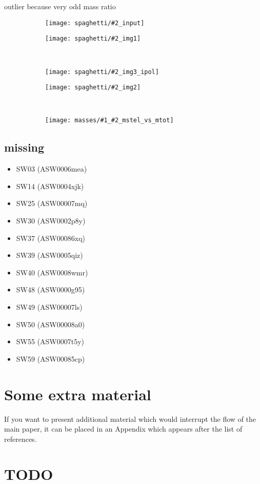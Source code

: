 \documentclass[fleqn,usenatbib]{mnras}
\newcommand{\inclfig}[2]{
  \centering
  \begin{subfigure}{0.5\linewidth}
    \texttt{[image: spaghetti/\#2\_input]}
  \end{subfigure}%
  \begin{subfigure}{0.5\linewidth}
    \texttt{[image: spaghetti/\#2\_img1]}
  \end{subfigure}%
  \\[-1px]%
  \begin{subfigure}{0.5\linewidth}
    \texttt{[image: spaghetti/\#2\_img3\_ipol]}
  \end{subfigure}%
  \begin{subfigure}{0.5\linewidth}
    \texttt{[image: spaghetti/\#2\_img2]}
  \end{subfigure}%
  \\[-1px]%
  \begin{subfigure}[b]{\linewidth}
    \texttt{[image: masses/\#1\_\#2\_mstel\_vs\_mtot]}
  \end{subfigure}
}
\begin{document}
outlier because very odd mass ratio
\begin{figure}
	\inclfig{SW42}{ASW00096rm_4Q3YCEWGLN}
\end{figure}







\subsection{missing}
\begin{itemize}
  \item SW03 (ASW0006mea)
  \item SW14 (ASW0004xjk)
  \item SW25 (ASW00007mq)
  \item SW30 (ASW0002p8y)
  \item SW37 (ASW00086xq)
  \item SW39 (ASW0005qiz)
  \item SW40 (ASW0008wmr)
  \item SW48 (ASW0000g95)
  \item SW49 (ASW00007ls)
  \item SW50 (ASW00008a0)
  \item SW55 (ASW0007t5y)
  \item SW59 (ASW00085cp)
\end{itemize}










\appendix

\section{Some extra material}

If you want to present additional material which would interrupt the flow of the main paper,
it can be placed in an Appendix which appears after the list of references.


\newpage

\section{TODO}
\listoftodos




\bsp	%
\label{lastpage}
\end{document}
